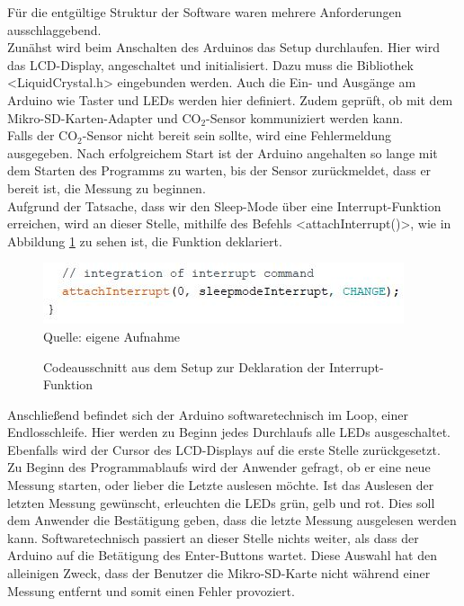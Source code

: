 \label{Softwaremplementierung}

Für die entgültige Struktur der Software waren mehrere Anforderungen ausschlaggebend. \\
Zunähst wird beim Anschalten des Arduinos das Setup durchlaufen. Hier wird das \ac{LCD}-Display, angeschaltet und initialisiert. Dazu muss die Bibliothek <LiquidCrystal.h> eingebunden werden. Auch die Ein- und Ausgänge am Arduino wie Taster und \ac{LED}s werden hier definiert. Zudem geprüft, ob mit dem Mikro-SD-Karten-Adapter und CO$_2$-Sensor kommuniziert werden kann. \\
Falls der CO$_2$-Sensor nicht bereit sein sollte, wird eine Fehlermeldung ausgegeben. Nach erfolgreichem Start ist der Arduino angehalten so lange mit dem Starten des Programms zu warten, bis der Sensor zurückmeldet, dass er bereit ist, die Messung zu beginnen. \\
Aufgrund der Tatsache, dass wir den Sleep-Mode über eine Interrupt-Funktion erreichen, wird an dieser Stelle, mithilfe des Befehls <attachInterrupt()>, wie in Abbildung \ref{fig:InterruptDekl} zu sehen ist, die Funktion deklariert. \\
\begin{figure}[!hbt]
	\centering
	\includegraphics[width=0.6\linewidth]{Images/InterruptDekl}
	\footnotesize \\Quelle: eigene Aufnahme
	\caption{Codeausschnitt aus dem Setup zur Deklaration der Interrupt-Funktion}
	\label{fig:InterruptDekl}
\end{figure}
Anschließend befindet sich der Arduino softwaretechnisch im Loop, einer Endlosschleife. Hier werden zu Beginn jedes Durchlaufs alle \ac{LED}s ausgeschaltet. Ebenfalls wird der Cursor des \ac{LCD}-Displays auf die erste Stelle zurückgesetzt. \\
Zu Beginn des Programmablaufs wird der Anwender gefragt, ob er eine neue Messung starten, oder lieber die Letzte auslesen möchte. Ist das Auslesen der letzten Messung gewünscht, erleuchten die LEDs grün, gelb und rot. Dies soll dem Anwender die Bestätigung geben, dass die letzte Messung ausgelesen werden kann. Softwaretechnisch passiert an dieser Stelle nichts weiter, als dass der Arduino auf die Betätigung des Enter-Buttons wartet. Diese Auswahl hat den alleinigen Zweck, dass der Benutzer die Mikro-SD-Karte nicht während einer Messung entfernt und somit einen Fehler provoziert. \\
